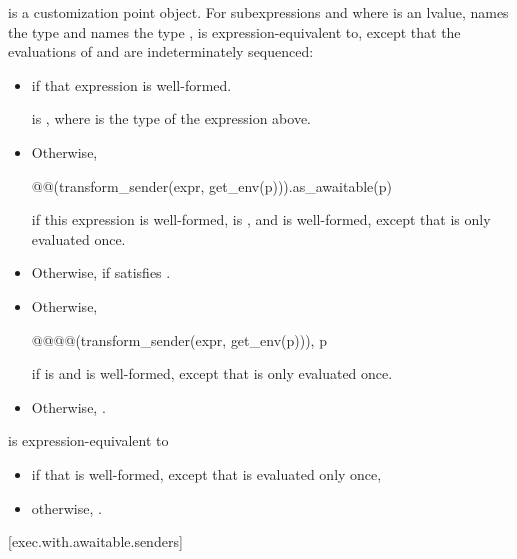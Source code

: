 \pnum
{} is a customization point object.
For subexpressions  and 
where  is an lvalue,
 names the type  and
 names the type ,
 is expression-equivalent to,
except that the evaluations of  and 
are indeterminately sequenced:
\begin{itemize}
\item
{} if that expression is well-formed.

\mandates
{} is ,
where  is the type of the expression above.
\item
Otherwise,
\begin{codeblock}
@@(transform_sender(expr, get_env(p))).as_awaitable(p)
\end{codeblock}
if this expression is well-formed,
 is , and
is well-formed,
except that  is only evaluated once.
\item
Otherwise, 
if 
satisfies .
\item
Otherwise,
\begin{codeblock}
@@{@@(transform_sender(expr, get_env(p))), p}
\end{codeblock}
if  is  and
is well-formed,
except that  is only evaluated once.
\item
Otherwise, .
\end{itemize}

\pnum
{} is expression-equivalent to
\begin{itemize}
\item
{} if that is well-formed,
except that  is evaluated only once,
\item
otherwise, .
\end{itemize}

[exec.with.awaitable.senders]{}

